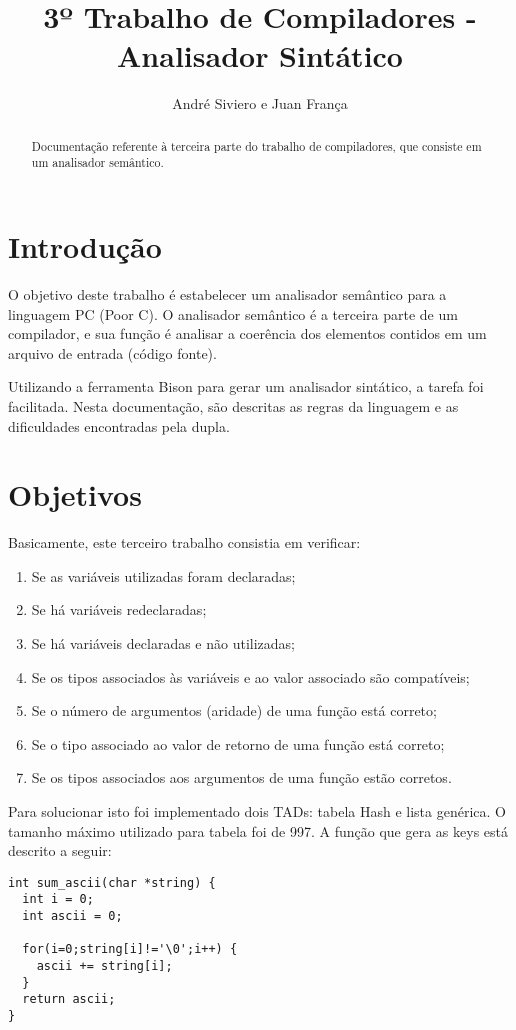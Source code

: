 \documentclass[a4paper,10pt]{article}
\title{3º Trabalho de Compiladores - Analisador Sintático}
\author{André Siviero e Juan França}
\begin{document}
\maketitle

\begin{abstract}
Documentação referente à terceira parte do trabalho de compiladores, que consiste em um analisador semântico.
\end{abstract}

\section{Introdução}
O objetivo deste trabalho é estabelecer um analisador semântico para a linguagem PC (Poor C). O analisador semântico é a terceira parte de um compilador,
e sua função é analisar a coerência dos elementos contidos em um arquivo de entrada (código fonte). 

Utilizando a ferramenta Bison para gerar um analisador sintático, a tarefa foi facilitada. Nesta documentação, são descritas as regras da linguagem e as dificuldades encontradas pela dupla.

\section{Objetivos}
Basicamente, este terceiro trabalho consistia em verificar:
\begin{enumerate}
\item Se as variáveis utilizadas foram declaradas;
\item Se há variáveis redeclaradas;
\item Se há variáveis declaradas e não utilizadas;
\item Se os tipos associados às variáveis e ao valor associado são compatíveis;
\item Se o número de argumentos (aridade) de uma função está correto;
\item Se o tipo associado ao valor de retorno de uma função está correto;
\item Se os tipos associados aos argumentos de uma função estão corretos.
\end{enumerate}

Para solucionar isto foi implementado dois TADs: tabela Hash e lista genérica. O tamanho máximo utilizado para tabela foi de 997. A função que gera as keys está descrito a seguir:

\begin{lstlisting}
int sum_ascii(char *string) {
  int i = 0;
  int ascii = 0;

  for(i=0;string[i]!='\0';i++) {
    ascii += string[i];
  }
  return ascii;
}
\end{lstlisting}
\end{document}
